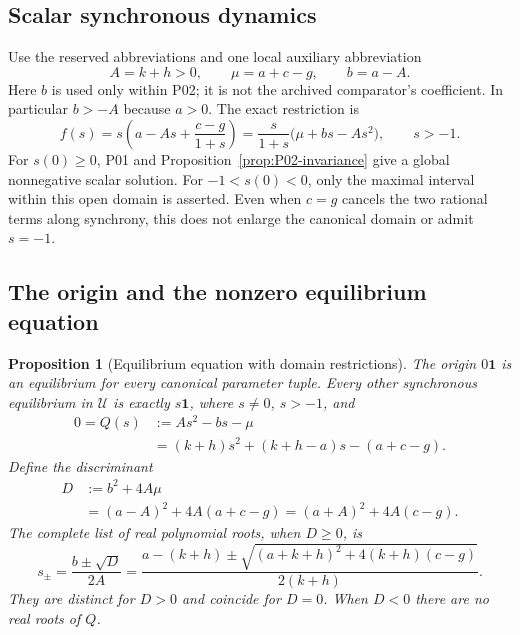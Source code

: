 \documentclass[11pt]{article}
\newcommand{\one}{\mathbf{1}}
\newcommand{\Domain}{\mathcal{U}}
\newtheorem{proposition}[theorem]{Proposition}
\theoremstyle{definition}
\theoremstyle{remark}
\begin{document}
\subsection{Scalar synchronous dynamics}
\label{slot:P02-2}
Use the reserved abbreviations and one local auxiliary abbreviation
\begin{equation}
\label{eq:P02-abbreviations}
 A=k+h>0,\qquad \mu=a+c-g,\qquad b=a-A.
\end{equation}
Here $b$ is used only within P02; it is not the archived comparator's
coefficient. In particular $b>-A$ because $a>0$. The exact restriction is
\begin{equation}
\label{eq:P02-scalar}
 f(s)=s\left(a-As+\frac{c-g}{1+s}\right)
     =\frac{s}{1+s}\bigl(\mu+bs-As^2\bigr),\qquad s>-1.
\end{equation}
For $s(0)\ge0$, P01 and Proposition~\ref{prop:P02-invariance}
give a global nonnegative scalar solution. For $-1<s(0)<0$, only
the maximal interval within this open domain is asserted. Even when
$c=g$ cancels the two rational terms along synchrony, this does not
enlarge the canonical domain or admit $s=-1$.

\subsection{The origin and the nonzero equilibrium equation}

\begin{proposition}[Equilibrium equation with domain restrictions]
\label{prop:P02-equation}
The origin $0\one$ is an equilibrium for every canonical parameter
tuple. Every other synchronous equilibrium in $\Domain$ is exactly
$s\one$, where $s\ne0$, $s>-1$, and
\begin{align}
 0=Q(s)&:=As^2-bs-\mu \label{eq:P02-polynomial}\\
       &=(k+h)s^2+(k+h-a)s-(a+c-g).\nonumber
\end{align}
Define the discriminant
\begin{align}
 D&:=b^2+4A\mu \label{eq:P02-discriminant}\\
  &=(a-A)^2+4A(a+c-g)
   =(a+A)^2+4A(c-g).\nonumber
\end{align}
The complete list of real polynomial roots, when $D\ge0$, is
\begin{equation}
\label{eq:P02-roots}
 s_\pm=\frac{b\pm\sqrt D}{2A}
 =\frac{a-(k+h)\pm
 \sqrt{(a+k+h)^2+4(k+h)(c-g)}}{2(k+h)}.
\end{equation}
They are distinct for $D>0$ and coincide for $D=0$. When $D<0$
there are no real roots of $Q$.
\end{proposition}
\end{document}
